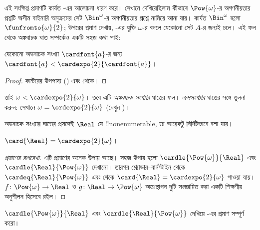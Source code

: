 \documentclass[../../../include/open-logic-section]{subfiles}
\begin{document}
এই সংক্ষিপ্ত প্রমাণটি কার্যত
-এর আলোচনা ধারণ করে।
সেখানে দেখিয়েছিলাম কীভাবে $\Pow{\omega}$-র
অগণনীয়তার প্রশ্নটি অসীম বাইনারি অনুক্রমের সেট
$\Bin^\omega$-র অগণনীয়তার প্রশ্নে নামিয়ে আনা যায়।
কার্যত $\Bin^{\omega}$ হলো $\funfromto{\omega}{2}$;
উপরের প্রমাণ দেখায়, -এর
যুক্তি $\omega$-র বদলে যেকোনো সেট $A$-র জন্যই চলে।
এই ফল থেকে অঙ্কবাচক ঘাত সম্পর্কেও একটি সহজ কথা পাই:

\begin{cor}
যেকোনো অঙ্কবাচক সংখ্যা $\cardfont{a}$-র জন্য
$\cardfont{a} < \cardexpo{2}{\cardfont{a}}$।
\end{cor}

\begin{proof}
কান্টরের উপপাদ্য () এবং
 থেকে।
\end{proof}
\noindent
তাই $\omega<\cardexpo{2}{\omega}$। তবে এটি
\emph{অঙ্কবাচক সংখ্যার} ঘাতের ফল। \emph{ক্রমসংখ্যার}
ঘাতের সঙ্গে তুলনা করুন: সেখানে
$\omega=\ordexpo{2}{\omega}$
(দেখুন )।

অঙ্কবাচক সংখ্যার ঘাতের প্রসঙ্গেই $\Real$ যে
!!{nonenumerable}, তা আরেকটু নির্দিষ্টভাবে বলা যায়।

\begin{thm}
$\card{\Real}=\cardexpo{2}{\omega}$।
\end{thm}

\begin{proof}[প্রমাণের রূপরেখা]
এটি প্রমাণের অনেক উপায় আছে। সহজ উপায় হলো
$\cardle{\Pow{\omega}}{\Real}$ এবং
$\cardle{\Real}{\Pow{\omega}}$ দেখানো। তারপর
শ্র্যোডার--বার্নস্টাইন থেকে
$\cardeq{\Real}{\Pow{\omega}}$ এবং
থেকে $\card{\Real}=\cardexpo{2}{\omega}$ পাওয়া যায়।
$f\colon\Pow{\omega}\to\Real$ ও
$g\colon\Real\to\Pow{\omega}$ অন্তঃস্থাপন দুটি
সংজ্ঞায়িত করা একটি শিক্ষণীয় অনুশীলন হিসেবে রইল।
\end{proof}

\begin{prob}
$\cardle{\Pow{\omega}}{\Real}$ এবং
$\cardle{\Real}{\Pow{\omega}}$ দেখিয়ে
-এর
প্রমাণ সম্পূর্ণ করো।
\end{prob}
\end{document}
